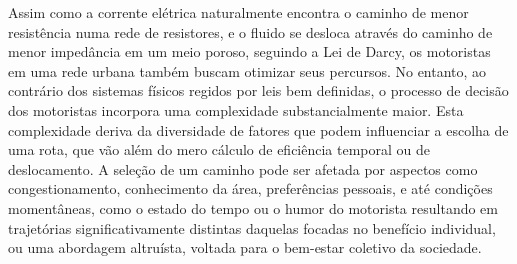\documentclass{article}
\begin{document}

Assim como a corrente elétrica naturalmente encontra o caminho de menor resistência numa rede de resistores, e o fluido se desloca através do caminho de menor impedância em um meio poroso, seguindo a Lei de Darcy, os motoristas em uma rede urbana também buscam otimizar seus percursos. No entanto, ao contrário dos sistemas físicos regidos por leis bem definidas, o processo de decisão dos motoristas incorpora uma complexidade substancialmente maior. Esta complexidade deriva da diversidade de fatores que podem influenciar a escolha de uma rota, que vão além do mero cálculo de eficiência temporal ou de deslocamento. A seleção de um caminho pode ser afetada por aspectos como congestionamento, conhecimento da área, preferências pessoais, e até condições momentâneas, como o estado do tempo ou o humor do motorista resultando em trajetórias significativamente distintas daquelas focadas no benefício individual, ou uma abordagem altruísta, voltada para o bem-estar coletivo da sociedade.
\end{document}
